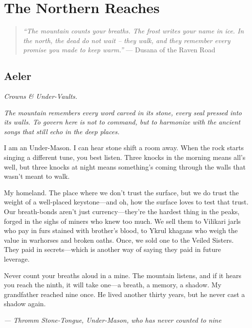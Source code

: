 \part{The Northern Reaches}
\begin{quote}
\small
\textit{``The mountain counts your breaths. The frost writes your name in ice. In the north, the dead do not wait -- they walk, and they remember every promise you made to keep warm.''}
\noindent --- Dusana of the Raven Road
\end{quote}
\chapter{Aeler}
\emph{Crowns \& Under-Vaults.}

\noindent
{\Large
\textit{The mountain remembers every word carved in its stone, every seal pressed into its walls. To govern here is not to command, but to harmonize with the ancient songs that still echo in the deep places.}

\vspace{0.5em}

I am an Under-Mason. I can hear stone shift a room away. When the rock starts singing a different tune, you best listen. Three knocks in the morning means all's well, but three knocks at night means something's coming through the walls that wasn't meant to walk.

\vspace{0.5em}

My homeland. The place where we don't trust the surface, but we do trust the weight of a well-placed keystone---and oh, how the surface loves to test that trust. Our breath-bonds aren't just currency---they're the hardest thing in the peaks, forged in the sighs of miners who knew too much. We sell them to Vilikari jarls who pay in furs stained with brother's blood, to Ykrul khagans who weigh the value in warhorses and broken oaths. Once, we sold one to the Veiled Sisters. They paid in secrets---which is another way of saying they paid in future leverage.

\vspace{0.5em}

Never count your breaths aloud in a mine. The mountain listens, and if it hears you reach the ninth, it will take one---a breath, a memory, a shadow. My grandfather reached nine once. He lived another thirty years, but he never cast a shadow again.

\vspace{1em}

\noindent\textit{--- Thromm Stone-Tongue, Under-Mason, who has never counted to nine}
}

